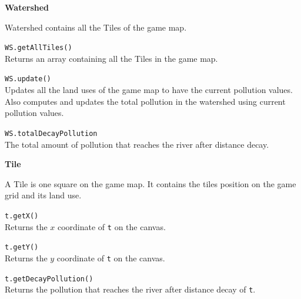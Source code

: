 \documentclass[10pt,twocolumn]{article}
\begin{document}
\thispagestyle{empty}



\noindent\textbf{\large Watershed}
\begin{description}

\item{}
Watershed contains all the Tiles of the game map.

\item{\texttt{WS.getAllTiles()}}\ \\[.25em]
%
  Returns an array containing all the Tiles in the game map.

\item{\texttt{WS.update()}}\ \\[.25em]
%
  Updates all the land uses of the game map to have the current pollution values.
  Also computes and updates the total pollution in the watershed using current pollution values.

\item{\texttt{WS.totalDecayPollution}}\ \\[.25em]
%
  The total amount of pollution that reaches the river after distance decay.

\end{description}

\noindent\textbf{\large Tile}
\begin{description}

\item{}
A Tile is one square on the game map. It contains the tiles position on the game grid and its land use. 

\item{\texttt{t.getX()}}\ \\[.25em]
%
  Returns the $x$ coordinate of \texttt{t} on the canvas. 

\item{\texttt{t.getY()}}\ \\[.25em]
%
  Returns the $y$ coordinate of \texttt{t} on the canvas. 

\item{\texttt{t.getDecayPollution()}}\ \\[.25em]
%
  Returns the pollution that reaches the river after distance decay of \texttt{t}.

\end{description}
\end{document}
